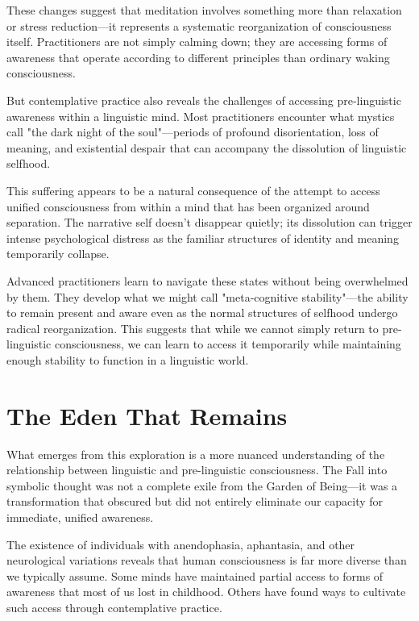 These changes suggest that meditation involves something more than relaxation or stress reduction—it represents a systematic reorganization of consciousness itself. Practitioners are not simply calming down; they are accessing forms of awareness that operate according to different principles than ordinary waking consciousness.

But contemplative practice also reveals the challenges of accessing pre-linguistic awareness within a linguistic mind. Most practitioners encounter what mystics call "the dark night of the soul"—periods of profound disorientation, loss of meaning, and existential despair that can accompany the dissolution of linguistic selfhood.

This suffering appears to be a natural consequence of the attempt to access unified consciousness from within a mind that has been organized around separation. The narrative self doesn't disappear quietly; its dissolution can trigger intense psychological distress as the familiar structures of identity and meaning temporarily collapse.

Advanced practitioners learn to navigate these states without being overwhelmed by them. They develop what we might call "meta-cognitive stability"—the ability to remain present and aware even as the normal structures of selfhood undergo radical reorganization. This suggests that while we cannot simply return to pre-linguistic consciousness, we can learn to access it temporarily while maintaining enough stability to function in a linguistic world.

\section{The Eden That Remains}

What emerges from this exploration is a more nuanced understanding of the relationship between linguistic and pre-linguistic consciousness. The Fall into symbolic thought was not a complete exile from the Garden of Being—it was a transformation that obscured but did not entirely eliminate our capacity for immediate, unified awareness.

The existence of individuals with anendophasia, aphantasia, and other neurological variations reveals that human consciousness is far more diverse than we typically assume. Some minds have maintained partial access to forms of awareness that most of us lost in childhood. Others have found ways to cultivate such access through contemplative practice.

